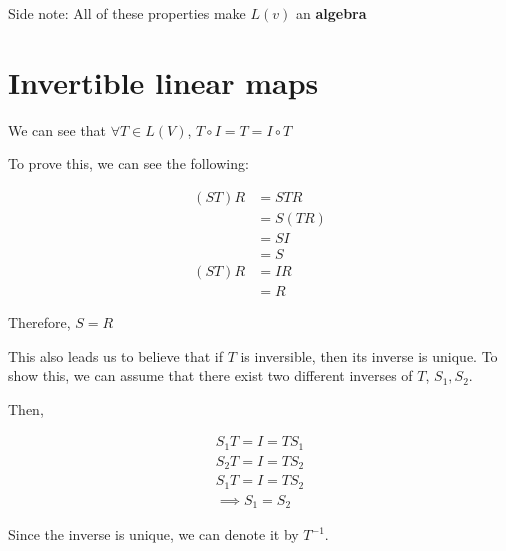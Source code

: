 Side note: All of these properties make $L(v)$ an \textbf{algebra}

\section*{Invertible linear maps}


We can see that $\forall T \in L(V)$, $T \circ I = T = I \circ T$



To prove this, we can see the following:

\begin{align*}
    (ST)R
     & = STR   \\
     & = S(TR) \\
     & = SI    \\
     & = S     \\
    (ST)R
     & = IR    \\
     & = R
\end{align*}

Therefore, $S = R$

This also leads us to believe that if $T$ is inversible, then its inverse is unique.
To show this, we can assume that there exist two different inverses of $T$, $S_1, S_2$.

Then,

\begin{align*}
    S_1 T = I = T S_1  \\
    S_2 T = I = T S_2  \\
    S_1 T = I = T S_ 2 \\
    \implies S_1 = S_2
\end{align*}

Since the inverse is unique, we can denote it by $T^{-1}$.



